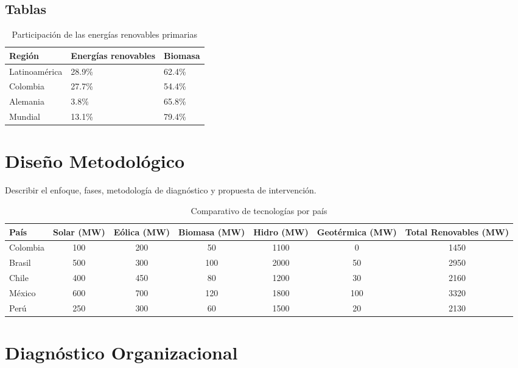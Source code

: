 \documentclass[12pt]{article}
\newcommand{\chapterbreak}{\clearpage \thispagestyle{fancy}}
\begin{document}
\subsection*{Tablas}
\begin{table}[H]
\centering
\caption{Participación de las energías renovables primarias}
\begin{tabular}{|l|l|l|}
\hline
Región & Energías renovables & Biomasa \\
\hline
Latinoamérica & 28.9\% & 62.4\% \\
Colombia & 27.7\% & 54.4\% \\
Alemania & 3.8\% & 65.8\% \\
Mundial & 13.1\% & 79.4\% \\
\hline
\end{tabular}
\end{table}

\chapterbreak
\section{Diseño Metodológico}
Describir el enfoque, fases, metodología de diagnóstico \cite{gonzalezModeloAdministracionProyectos2012} y propuesta de intervención.

\clearpage
\thispagestyle{empty}
\begin{landscape}
\begin{table}[H]
\centering
\caption{Comparativo de tecnologías por país}
\begin{tabular}{|l|c|c|c|c|c|c|}
\hline
País & Solar (MW) & Eólica (MW) & Biomasa (MW) & Hidro (MW) & Geotérmica (MW) & Total Renovables (MW) \\
\hline
Colombia & 100 & 200 & 50 & 1100 & 0 & 1450 \\
Brasil & 500 & 300 & 100 & 2000 & 50 & 2950 \\
Chile & 400 & 450 & 80 & 1200 & 30 & 2160 \\
México & 600 & 700 & 120 & 1800 & 100 & 3320 \\
Perú & 250 & 300 & 60 & 1500 & 20 & 2130 \\
\hline
\end{tabular}
\end{table}
\end{landscape}

\chapterbreak
\section{Diagnóstico Organizacional}
\end{document}
